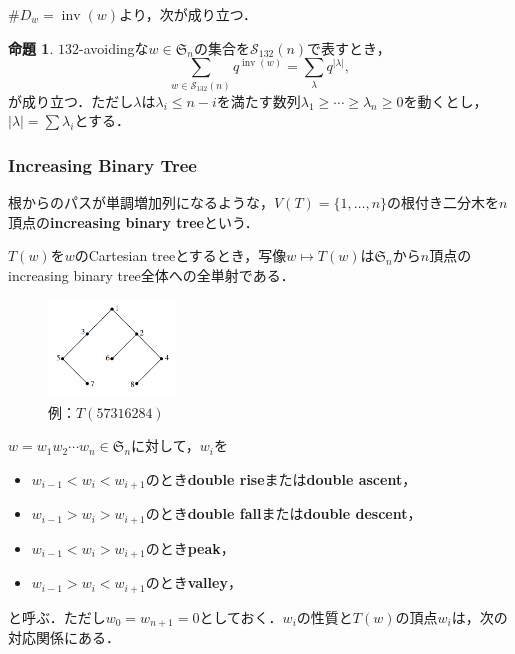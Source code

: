 \documentclass[xelatex,ja=standard,a4paper,14pt,everyparhook=compat]{bxjsarticle}
\newcommand{\fS}{\mathfrak{S}}
\DeclareMathOperator*{\inv}{inv}
\theoremstyle{definition}
\newtheorem{proposition}[theorem]{命題}
\begin{document}
$\#D_w = \inv(w)$より，次が成り立つ．

\begin{proposition}
    $132$-avoidingな$w \in \fS_n$の集合を$\mathcal{S}_{132}(n)$で表すとき， \begin{equation*}
        \sum_{w \in \mathcal{S}_{132}(n)} q^{\inv(w)} = \sum_{\lambda} q^{|\lambda|},
    \end{equation*}
    が成り立つ．ただし$\lambda$は$\lambda_i \leq n-i$を満たす数列$\lambda_1 \geq \cdots \geq \lambda_n \geq 0$を動くとし，$|\lambda| = \sum \lambda_i$とする．
\end{proposition}

\subsubsection{Increasing Binary Tree}

根からのパスが単調増加列になるような，$V(T)=\{1, \ldots, n\}$の根付き二分木を$n$頂点の\textbf{increasing binary tree}という．

$T(w)$を$w$のCartesian treeとするとき，写像$w \mapsto T(w)$は$\fS_n$から$n$頂点のincreasing binary tree全体への全単射である．

\begin{figure}
    \centering
    \includegraphics[width=0.3\textwidth]{fig1.8.png}
    \captionsetup{labelformat=empty}
    \caption{例：$T(57316284)$}
\end{figure}

$w = w_1 w_2 \cdots w_n \in \fS_n$に対して，$w_i$を \begin{itemize}
    \item $w_{i-1} < w_i < w_{i+1}$のとき\textbf{double rise}または\textbf{double ascent}，
    \item $w_{i-1} > w_i > w_{i+1}$のとき\textbf{double fall}または\textbf{double descent}，
    \item $w_{i-1} < w_i > w_{i+1}$のとき\textbf{peak}，
    \item $w_{i-1} > w_i < w_{i+1}$のとき\textbf{valley}，
\end{itemize}
と呼ぶ．ただし$w_0 = w_{n+1} = 0$としておく．$w_i$の性質と$T(w)$の頂点$w_i$は，次の対応関係にある．
\end{document}
